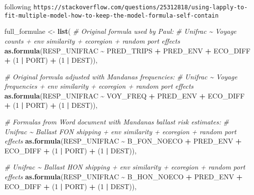 \documentclass[
]{article}
\newenvironment{Shaded}{\begin{snugshade}}{\end{snugshade}}
\newcommand{\CommentTok}[1]{\textcolor[rgb]{0.56,0.35,0.01}{\textit{#1}}}
\newcommand{\DecValTok}[1]{\textcolor[rgb]{0.00,0.00,0.81}{#1}}
\newcommand{\KeywordTok}[1]{\textcolor[rgb]{0.13,0.29,0.53}{\textbf{#1}}}
\newcommand{\NormalTok}[1]{#1}
\newcommand{\OperatorTok}[1]{\textcolor[rgb]{0.81,0.36,0.00}{\textbf{#1}}}
\newcommand{\StringTok}[1]{\textcolor[rgb]{0.31,0.60,0.02}{#1}}
\begin{document}
following
\texttt{https://stackoverflow.com/questions/25312818/using-lapply-to-fit-multiple-model-how-to-keep-the-model-formula-self-contain}

\begin{Shaded}
\begin{Highlighting}[]
\NormalTok{full\_formulae <{-}}\StringTok{ }\KeywordTok{list}\NormalTok{(}
  \CommentTok{\# Original formula used by Paul:}
  \CommentTok{\# Unifrac \textasciitilde{} Voyage counts  + env similarity + ecoregion + random port effects}
  \KeywordTok{as.formula}\NormalTok{(RESP\_UNIFRAC }\OperatorTok{\textasciitilde{}}\StringTok{ }\NormalTok{PRED\_TRIPS }\OperatorTok{+}\StringTok{ }\NormalTok{PRED\_ENV }\OperatorTok{+}\StringTok{ }\NormalTok{ECO\_DIFF }\OperatorTok{+}\StringTok{ }\NormalTok{(}\DecValTok{1} \OperatorTok{|}\StringTok{ }\NormalTok{PORT) }\OperatorTok{+}\StringTok{ }\NormalTok{(}\DecValTok{1} \OperatorTok{|}\StringTok{ }\NormalTok{DEST)),}

  \CommentTok{\# Original formula adjusted with Mandana\textquotesingle{}s frequencies:}
  \CommentTok{\# Unifrac \textasciitilde{} Voyage frequencies + env similarity + ecoregion + random port effects}
  \KeywordTok{as.formula}\NormalTok{(RESP\_UNIFRAC }\OperatorTok{\textasciitilde{}}\StringTok{ }\NormalTok{VOY\_FREQ }\OperatorTok{+}\StringTok{ }\NormalTok{PRED\_ENV }\OperatorTok{+}\StringTok{ }\NormalTok{ECO\_DIFF }\OperatorTok{+}\StringTok{ }\NormalTok{(}\DecValTok{1} \OperatorTok{|}\StringTok{ }\NormalTok{PORT) }\OperatorTok{+}\StringTok{ }\NormalTok{(}\DecValTok{1} \OperatorTok{|}\StringTok{ }\NormalTok{DEST)),}

  \CommentTok{\# Formulas from Word document with Mandana\textquotesingle{}s ballast risk estimates:}
  \CommentTok{\# Unifrac \textasciitilde{} Ballast FON shipping + env similarity + ecoregion + random port effects}
  \KeywordTok{as.formula}\NormalTok{(RESP\_UNIFRAC }\OperatorTok{\textasciitilde{}}\StringTok{ }\NormalTok{B\_FON\_NOECO }\OperatorTok{+}\StringTok{ }\NormalTok{PRED\_ENV }\OperatorTok{+}\StringTok{ }\NormalTok{ECO\_DIFF }\OperatorTok{+}\StringTok{ }\NormalTok{(}\DecValTok{1} \OperatorTok{|}\StringTok{ }\NormalTok{PORT) }\OperatorTok{+}\StringTok{ }\NormalTok{(}\DecValTok{1} \OperatorTok{|}\StringTok{ }\NormalTok{DEST)),}

  \CommentTok{\# Unifrac \textasciitilde{} Ballast HON shipping + env similarity + ecoregion + random port effects}
  \KeywordTok{as.formula}\NormalTok{(RESP\_UNIFRAC }\OperatorTok{\textasciitilde{}}\StringTok{ }\NormalTok{B\_HON\_NOECO }\OperatorTok{+}\StringTok{ }\NormalTok{PRED\_ENV }\OperatorTok{+}\StringTok{ }\NormalTok{ECO\_DIFF }\OperatorTok{+}\StringTok{ }\NormalTok{(}\DecValTok{1} \OperatorTok{|}\StringTok{ }\NormalTok{PORT) }\OperatorTok{+}\StringTok{ }\NormalTok{(}\DecValTok{1} \OperatorTok{|}\StringTok{ }\NormalTok{DEST)),}


\end{Highlighting}
\end{Shaded}
\end{document}
